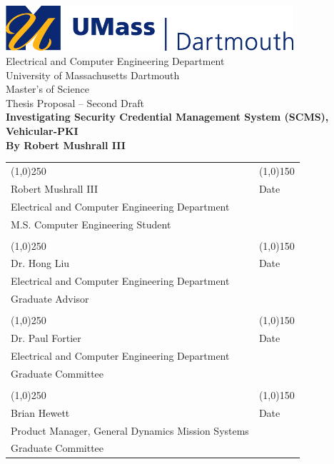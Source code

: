 \documentclass [11pt]{article}
\begin{document}
\begin{titlepage}
	\centering
	\includegraphics[width=0.8\textwidth]{images/umd_logo.jpg} \\ \bigskip
	\LARGE{Electrical and Computer Engineering Department \\University of Massachusetts Dartmouth}\\
	\bigskip 
	\LARGE{Master's of Science \\ Thesis Proposal -- Second Draft} \\
	\bigskip 
	\Huge{\bf Investigating Security Credential Management System (SCMS), Vehicular-PKI} \\ \medskip
	\LARGE{\bf By Robert Mushrall III}

	\vfill
	\begin{table}[!hb]
		\centering
		\begin{tabular}{ l l }
			\line(1,0){250} & \line(1,0){150} \\
			\small{Robert Mushrall III}  & \small{Date} \\
			\small{Electrical and Computer Engineering Department} \\
			\small{M.S. Computer Engineering Student} & \\
			\vspace{.3cm} \\
			\line(1,0){250} & \line(1,0){150} \\
			\small{Dr. Hong Liu} & \small{Date} \\
			\small{Electrical and Computer Engineering Department} \\
			\small{Graduate Advisor} & \\
			\vspace{.3cm} \\
			\line(1,0){250} & \line(1,0){150} \\
			\small{Dr. Paul Fortier} & \small{Date} \\
			\small{Electrical and Computer Engineering Department} \\
			\small{Graduate Committee} & \\
			\vspace{.3cm} \\
			\line(1,0){250} & \line(1,0){150} \\
			\small{Brian Hewett} & \small{Date} \\
			\small{Product Manager, General Dynamics Mission Systems} \\
			\small{Graduate Committee} & \\
		\end{tabular}
	\end{table}
	\thispagestyle{empty}
\end{titlepage}
\setcounter{page}{2}
\end{document}
